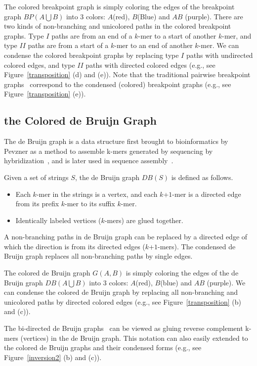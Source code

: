 \documentclass[12pt]{article}
\begin{document}
The colored breakpoint graph is simply coloring the edges of the breakpoint graph $BP(A \bigcup B)$ into 3 colors: $A$(red), $B$(Blue) and $AB$ (purple).
There are two kinds of non-branching and unicolored paths in the colored breakpoint graphs. 
Type $I$ paths are from an end of a $k$-mer to a start of another $k$-mer, and type $II$ paths are from a start of a $k$-mer to an end of another $k$-mer.  
We can condense the colored breakpoint graphs by replacing type $I$ paths with undirected colored edges, 
and type $II$ paths with directed colored edges (e.g., see Figure~\ref{transposition} (d) and (e)). 
Note that the traditional pairwise breakpoint graphs~\cite{bafna1993} correspond to the condensed (colored) breakpoint graphs (e.g., see Figure~\ref{transposition} (e)).

\subsection{the Colored de Bruijn Graph}
The de Bruijn graph is a data structure first brought to bioinformatics by Pevzner as a method to assemble k-mers
generated by sequencing by hybridization~\cite{pevzner1989}, and is later used in sequence assembly~\cite{idury1995,pevzner2001eulerian}.

Given a set of strings $S$, the de Bruijn graph $DB(S)$ is defined as follows.
\begin{itemize}
\item Each $k$-mer in the strings is a vertex, 
and each $k$+$1$-mer is a directed edge from its prefix $k$-mer to its suffix $k$-mer.
\item Identically labeled vertices ($k$-mers) are glued together.
\end{itemize}
A non-branching paths in de Bruijn graph can be replaced by a directed edge of which the direction is from its directed edges ($k$+$1$-mers). 
The condensed de Bruijn graph replaces all non-branching paths by single edges.

The colored de Bruijn graph $G(A,B)$ is simply coloring the edges of the de Bruijn graph $DB(A \bigcup B)$ into 3 colors: $A$(red), $B$(blue) and $AB$ (purple). 
We can condense the colored de Bruijn graph by replacing all non-branching and unicolored paths by directed colored edges (e.g., see Figure~\ref{transposition} (b) and (c)).

The bi-directed de Bruijn graphs~\cite{medvedev2007} can be viewed as gluing reverse complement k-mers (vertices) in the de Bruijn graph. 
This notation can also easily extended to the colored de Bruijn graphs and their condensed forms (e.g., see Figure~\ref{inversion2} (b) and (c)).
\end{document}
